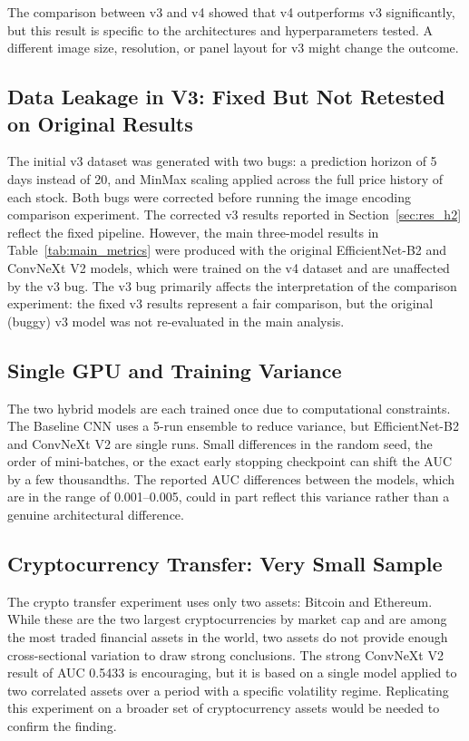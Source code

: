 The comparison between v3 and v4 showed that v4 outperforms v3 significantly, but this result is specific to the architectures and hyperparameters tested. A different image size, resolution, or panel layout for v3 might change the outcome.

\subsection{Data Leakage in V3: Fixed But Not Retested on Original Results}

The initial v3 dataset was generated with two bugs: a prediction horizon of 5 days instead of 20, and MinMax scaling applied across the full price history of each stock. Both bugs were corrected before running the image encoding comparison experiment. The corrected v3 results reported in Section~\ref{sec:res_h2} reflect the fixed pipeline. However, the main three-model results in Table~\ref{tab:main_metrics} were produced with the original EfficientNet-B2 and ConvNeXt V2 models, which were trained on the v4 dataset and are unaffected by the v3 bug. The v3 bug primarily affects the interpretation of the comparison experiment: the fixed v3 results represent a fair comparison, but the original (buggy) v3 model was not re-evaluated in the main analysis.

\subsection{Single GPU and Training Variance}

The two hybrid models are each trained once due to computational constraints. The Baseline CNN uses a 5-run ensemble to reduce variance, but EfficientNet-B2 and ConvNeXt V2 are single runs. Small differences in the random seed, the order of mini-batches, or the exact early stopping checkpoint can shift the AUC by a few thousandths. The reported AUC differences between the models, which are in the range of 0.001--0.005, could in part reflect this variance rather than a genuine architectural difference.

\subsection{Cryptocurrency Transfer: Very Small Sample}

The crypto transfer experiment uses only two assets: Bitcoin and Ethereum. While these are the two largest cryptocurrencies by market cap and are among the most traded financial assets in the world, two assets do not provide enough cross-sectional variation to draw strong conclusions. The strong ConvNeXt V2 result of AUC 0.5433 is encouraging, but it is based on a single model applied to two correlated assets over a period with a specific volatility regime. Replicating this experiment on a broader set of cryptocurrency assets would be needed to confirm the finding.

